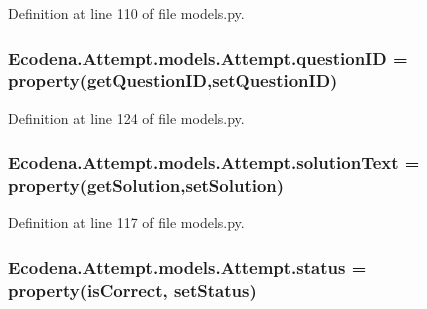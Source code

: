 Definition at line 110 of file models.py.

\hypertarget{class_ecodena_1_1_attempt_1_1models_1_1_attempt_af6d21b0d06e1565c641f9526ab4891d4}{
\subsubsection[{questionID}]{\setlength{\rightskip}{0pt plus 5cm}Ecodena.Attempt.models.Attempt.questionID = property(getQuestionID,setQuestionID)}}
\label{d5/da0/class_ecodena_1_1_attempt_1_1models_1_1_attempt_af6d21b0d06e1565c641f9526ab4891d4}


Definition at line 124 of file models.py.

\hypertarget{class_ecodena_1_1_attempt_1_1models_1_1_attempt_a0ef6767e7f18226ecd46be45e35f357b}{
\subsubsection[{solutionText}]{\setlength{\rightskip}{0pt plus 5cm}Ecodena.Attempt.models.Attempt.solutionText = property(getSolution,setSolution)}}
\label{d5/da0/class_ecodena_1_1_attempt_1_1models_1_1_attempt_a0ef6767e7f18226ecd46be45e35f357b}


Definition at line 117 of file models.py.

\hypertarget{class_ecodena_1_1_attempt_1_1models_1_1_attempt_a1110fd10d7a9e73bae4c5f4208f24d9b}{
\subsubsection[{status}]{\setlength{\rightskip}{0pt plus 5cm}Ecodena.Attempt.models.Attempt.status = property(isCorrect, setStatus)}}
\label{d5/da0/class_ecodena_1_1_attempt_1_1models_1_1_attempt_a1110fd10d7a9e73bae4c5f4208f24d9b}


